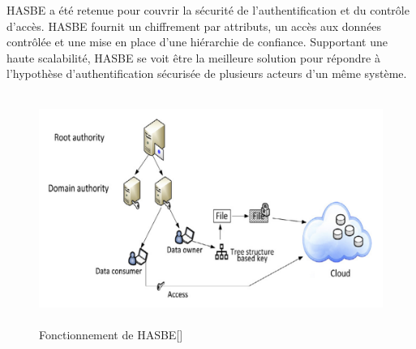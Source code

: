 HASBE a été retenue pour couvrir la sécurité de l'authentification et du contrôle d'accès. HASBE fournit un chiffrement par attributs, un accès aux données contrôlée et une mise en place d'une hiérarchie de confiance. Supportant une haute scalabilité, HASBE se voit être la meilleure solution pour répondre à l'hypothèse d'authentification sécurisée de plusieurs acteurs d'un même système.

\begin{figure}[hb]
	\center
	\includegraphics[height=7.5cm]{./pics/hasbe.png}
	\caption{Fonctionnement de HASBE[\cite{security_cloud_survey}]}
	\label{label-image2}
\end{figure}

